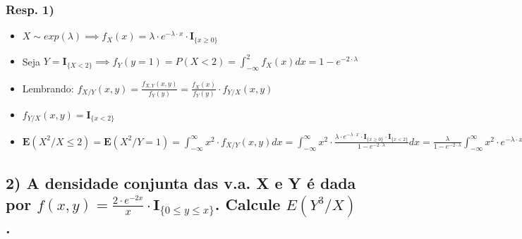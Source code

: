 \documentclass[english]{article}
\begin{document}
\subsubsection*{\textmd{Resp}. \textmd{1)}}
\begin{itemize}
\item $X\sim exp(\lambda)\implies f_{X}(x)=\lambda\cdot e^{-\lambda\cdot x}\cdot\mathbf{I}_{\{x\geq0\}}$
\item Seja $Y=\mathbf{I}_{\{X<2\}}\implies f_{Y}(y=1)=P(X<2)=\int_{-\infty}^{2}f_{X}(x)dx=1-e^{-2\cdot\lambda}$
\item Lembrando: $f_{X/Y}(x,y)=\frac{f_{X,Y}(x,y)}{f_{Y}(y)}=\frac{f_{X}(x)}{f_{Y}(y)}\cdot f_{Y/X}(x,y)$
\item $f_{Y/X}(x,y)=\mathbf{I}_{\{x<2\}}$
\item $\mathbf{E}(X^{2}/X\leq2)=\mathbf{E}(X^{2}/Y=1)=\int_{-\infty}^{\infty}x^{2}\cdot f_{X/Y}(x,y)dx=\int_{-\infty}^{\infty}x^{2}\cdot\frac{\lambda\cdot e^{-\lambda\cdot x}\cdot\mathbf{I}_{\{x\geq0\}}\cdot\mathbf{I}_{\{x<2\}}}{1-e^{-2\cdot\lambda}}dx=\frac{\lambda}{1-e^{-2\cdot\lambda}}\int_{-\infty}^{\infty}x^{2}\cdot e^{-\lambda\cdot x}\cdot\mathbf{I}_{\{x\geq0\}}\cdot\mathbf{I}_{\{x<2\}}dx=\frac{\lambda}{1-e^{-2\cdot\lambda}}(-x^{2}\cdot\frac{e^{-\lambda\cdot x}}{\lambda^{2}}|_{x=0}^{x=2}+2\int_{0}^{2}x\cdot e^{-\lambda\cdot x}dx)=\frac{\lambda}{1-e^{-2\cdot\lambda}}\cdot(-4\cdot\frac{e^{-4\cdot\lambda}}{\lambda}+2(-x\cdot\frac{e^{-\lambda\cdot x}}{\lambda^{2}}|_{x=0}^{x=2}+\int_{0}^{2}\frac{e^{-\lambda\cdot x}}{\lambda^{2}}dx))=\frac{\lambda}{1-e^{-2\cdot\lambda}}\cdot(-4\cdot\frac{e^{-4\cdot\lambda}}{\lambda}-4\cdot\frac{e^{-2\cdot\lambda}}{\lambda^{2}}-2\cdot\frac{e^{-2\cdot\lambda}}{\lambda^{3}}+\frac{2}{\lambda^{3}})$
\end{itemize}

\subsection*{\textcompwordmark{}}


\subsection*{\textmd{2) A densidade conjunta das v.a. X e Y é dada por $f(x,y)=\frac{2\cdot e^{-2x}}{x}\cdot\mathbf{I}_{\{0\leq y\leq x\}}$.
Calcule $E(Y^{3}/X)$.}}
\end{document}
